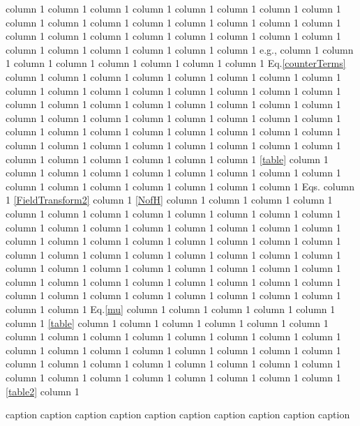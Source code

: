\documentclass[a4paper,11pt]{article}
\makeatletter
\newcommand*{\eg}{e.g., }
\newcommand*{\Eq}{Eq.\@\xspace}
\newcommand*{\Eqs}{Eqs.\@\xspace}
\makeatother
\begin{document}
  column 1   column 1  column 1  column 1  column 1  column 1  column 1  column 1   column 1  column 1  column 1  column 1   column 1  column 1  column 1  column 1  column 1   column 1  column 1  column 1  column 1  column 1  column 1  column 1  column 1  column 1  column 1  column 1   column 1  column 1 \eg  column 1  column 1  column 1  column 1  column 1  column 1  column 1  column 1 \Eq \eqref{counterTerms}  column 1  column 1  column 1  column 1  column 1  column 1  column 1  column 1  column 1  column 1  column 1  column 1  column 1  column 1  column 1  column 1  column 1  column 1  column 1  column 1  column 1  column 1  column 1  column 1   column 1  column 1  column 1   
  column 1  column 1  column 1  column 1  column 1  column 1  column 1   column 1  column 1  column 1  column 1   column 1  column 1  column 1  column 1  column 1  column 1  column 1  column 1  column 1   column 1  column 1  column 1  column 1   column 1  column 1  column 1 \ref{table}  column 1   column 1  column 1  column 1   column 1  column 1  column 1  column 1  column 1  column 1  column 1  column 1  column 1   column 1  column 1  column 1 \Eqs  column 1 \ref{FieldTransform2}  column 1 \ref{NofH}  column 1  column 1   column 1   column 1  column 1  column 1  column 1   column 1  column 1  column 1  column 1  column 1  column 1  column 1  column 1  column 1  column 1  column 1  column 1  column 1  column 1  column 1  column 1   column 1   column 1  column 1  column 1  column 1  column 1  column 1  column 1  column 1  column 1  column 1  column 1  column 1  column 1  column 1  column 1   column 1  column 1  column 1  column 1  column 1  column 1  column 1  column 1  column 1  column 1  column 1  column 1  column 1  column 1  column 1  column 1  column 1     column 1  column 1  column 1  column 1  column 1  column 1 \Eq \eqref{mu}  column 1  column 1  column 1   column 1  column 1  column 1 \ref{table}  column 1  column 1   column 1  column 1  column 1  column 1  column 1  column 1  column 1  column 1   column 1  column 1  column 1  column 1  column 1  column 1  column 1  column 1   column 1  column 1  column 1   column 1  column 1  column 1  column 1  column 1  column 1  column 1  column 1  column 1  column 1  column 1  column 1  column 1  column 1  column 1  column 1  column 1 \ref{table2}  column 1   	\begin{table}
	\begin{center}
		
		\caption{  caption  caption  caption  caption  caption  caption  caption  caption  caption  caption }
		\label{table2}
		\end{center}
	\end{table}
\end{document}
